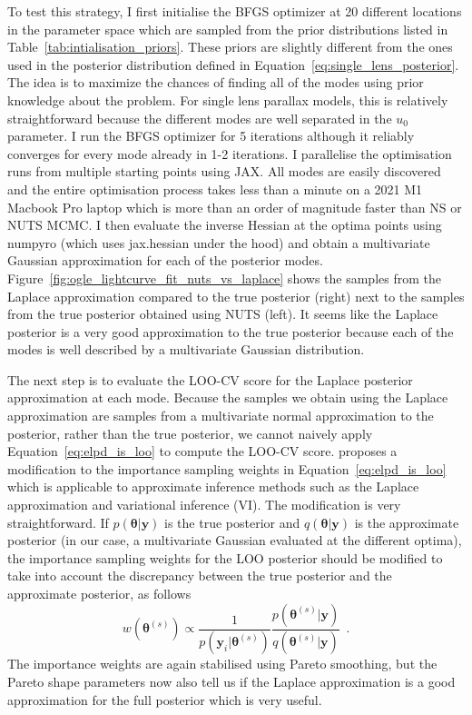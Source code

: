\documentclass[12pt,dvipsnames]{report}
\newcommand{\ssf}[1]{\textsf{#1}}
\renewcommand{\vec}[1]{\boldsymbol{\mathbf{#1}}}
\newcommand{\hquad}{~~}
\begin{document}
To test this strategy, I first initialise the BFGS optimizer at 20 different locations in 
the parameter space which are sampled from the prior distributions listed in 
Table~\ref{tab:intialisation_priors}. These priors are slightly different from the 
ones used in the posterior distribution defined in Equation~\ref{eq:single_lens_posterior}.
The idea is to maximize the chances of finding all of the 
modes using prior knowledge about the problem. For single lens parallax models, 
this is relatively straightforward because the different modes are well separated 
in the $u_0$ parameter. I run the BFGS optimizer for 5 iterations although it 
reliably converges for every mode already in 1-2 iterations.  I parallelise the optimisation 
runs from multiple starting points using \ssf{JAX}. 
All modes are easily discovered and the entire optimisation process takes less than
a minute on a 2021 M1 Macbook Pro laptop which is more than 
an order of magnitude faster than NS or NUTS MCMC. I then evaluate the 
inverse Hessian at the optima points using \ssf{numpyro} (which uses \ssf{jax.hessian} 
under the hood) and obtain a multivariate Gaussian approximation for each of the posterior 
modes. Figure~\ref{fig:ogle_lightcurve_fit_nuts_vs_laplace} shows the samples from the 
Laplace approximation compared to the true posterior (right) next to the samples from the 
true posterior obtained using NUTS (left). It seems like the Laplace posterior 
is a very good approximation to the true posterior because each of the modes 
is well described by a multivariate Gaussian distribution. 


The next step is to evaluate the LOO-CV score for the Laplace posterior approximation 
at each mode. Because the samples we obtain using the Laplace approximation are samples
from a multivariate normal approximation to the posterior, rather than the true posterior,
we cannot naively apply Equation~\ref{eq:elpd_is_loo} to compute the LOO-CV score. 
\citet{pmlr-v97-magnusson19a} proposes  a modification to the importance sampling 
weights in Equation~\ref{eq:elpd_is_loo} which is applicable to approximate inference 
methods such as the Laplace approximation and variational inference (VI).
The modification is very straightforward. If $p(\vec\theta|\vec y)$ is the true posterior
and $q(\vec\theta|\vec y)$ is the approximate posterior (in our case, a multivariate 
Gaussian evaluated at the different optima), the importance sampling weights for the LOO 
posterior should be modified to take into account the discrepancy between the true 
posterior and the approximate posterior, as follows
\begin{equation}
w\left(\vec\theta^{(s)}\right)\propto\frac{1}{p\left(\vec y_i|\vec\theta^{(s)}\right)} \frac{p\left(\vec\theta^{(s)}|\vec y\right)}{q\left(\vec\theta^{(s)}|\vec y\right)}
\hquad .
\label{eq:is_weights_laplace}
\end{equation}
The importance weights are again stabilised using Pareto smoothing, but the Pareto shape 
parameters now also tell us if the Laplace approximation is a good approximation for
the full posterior \citep[see also][]{pmlr-v80-yao18a} which is very useful.
\end{document}
